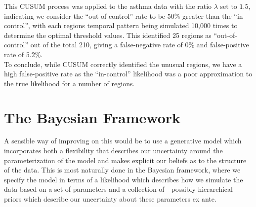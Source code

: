 \documentclass{article}
\begin{document}
This CUSUM process was applied to the asthma data with the ratio $\lambda$ set to $1.5$, indicating we consider the ``out-of-control'' rate to be 50\% greater than the ``in-control'', with each regions temporal pattern being simulated 10,000 times to determine the optimal threshold values. This identified 25 regions as ``out-of-control'' out of the total 210, giving a false-negative rate of 0\% and false-positive rate of 5.2\%. \\

To conclude, while CUSUM correctly identified the unusual regions, we have a high false-positive rate as the ``in-control'' likelihood was a poor approximation to the true likelihood for a number of regions.  

\section{The Bayesian Framework}

A sensible way of improving on this would be to use a generative model which incorporates both a flexibility that describes our uncertainty around the parameterization of the model and makes explicit our beliefs as to the structure of the data. This is most naturally done in the Bayesian framework, where we specify the model in terms of a likelihood which describes how we simulate the data based on a set of parameters and a collection of---possibly hierarchical---priors which describe our uncertainty about these parameters ex ante. 
\end{document}
